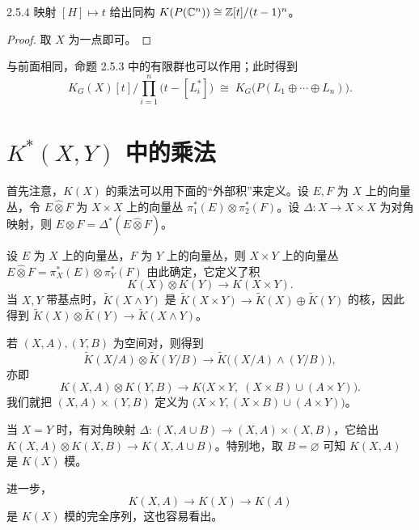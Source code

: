 \begin{corollary*}{2.5.4}
  映射 $[H]\mapsto t$ 给出同构 $K(P(\mathbb{C}^n))\cong\mathbb{Z}[t]/(t-1)^n$。
\end{corollary*}

\begin{proof}
  取 $X$ 为一点即可。
\end{proof}

与前面相同，命题 2.5.3 中的有限群也可以作用；此时得到
\[
K_G(X)[t]\Big/\prod_{i=1}^{n}\bigl(t-[L_i^*]\bigr)\;\cong\;K_G\bigl(P(L_1\oplus\cdots\oplus L_n)\bigr).
\]

\section{$K^*(X,Y)$ 中的乘法}

首先注意，$K(X)$ 的乘法可以用下面的“外部积”来定义。设 $E,F$ 为 $X$ 上的向量丛，令 $E\hat\otimes F$ 为 $X\times X$ 上的向量丛 $\pi_1^*(E)\otimes\pi_2^*(F)$。设 $\Delta\colon X\to X\times X$ 为对角映射，则 $E\otimes F=\Delta^*(E\hat\otimes F)$。

设 $E$ 为 $X$ 上的向量丛，$F$ 为 $Y$ 上的向量丛，则 $X\times Y$ 上的向量丛 $E\hat\otimes F=\pi_X^*(E)\otimes\pi_Y^*(F)$ 由此确定，它定义了积
\[
K(X)\otimes K(Y)\longrightarrow K(X\times Y).
\]
当 $X,Y$ 带基点时，$\tilde K(X\wedge Y)$ 是 $\tilde K(X\times Y)\to\tilde K(X)\oplus\tilde K(Y)$ 的核，因此得到 $\tilde K(X)\otimes\tilde K(Y)\to\tilde K(X\wedge Y)$。

若 $(X,A),(Y,B)$ 为空间对，则得到
\[
\tilde K(X/A)\otimes\tilde K(Y/B)\longrightarrow\tilde K\bigl((X/A)\wedge(Y/B)\bigr),
\]
亦即
\[
K(X,A)\otimes K(Y,B)\longrightarrow K\bigl(X\times Y,\;(X\times B)\cup(A\times Y)\bigr).
\]
我们就把 $(X,A)\times(Y,B)$ 定义为 $\bigl(X\times Y,(X\times B)\cup(A\times Y)\bigr)$。

当 $X=Y$ 时，有对角映射 $\Delta\colon(X,A\cup B)\to(X,A)\times(X,B)$，它给出 $K(X,A)\otimes K(X,B)\to K(X,A\cup B)$。特别地，取 $B=\varnothing$ 可知 $K(X,A)$ 是 $K(X)$ 模。

进一步，
\[
K(X,A)\longrightarrow K(X)\longrightarrow K(A)
\]
是 $K(X)$ 模的完全序列，这也容易看出。

